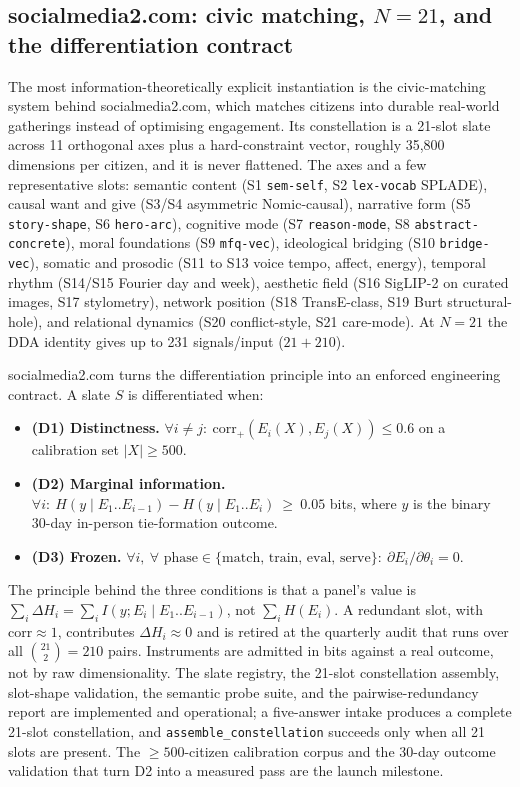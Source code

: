 \documentclass[10pt,twocolumn]{article}
\begin{document}
\subsection{socialmedia2.com: civic matching, $N=21$, and the
differentiation contract}
\label{sec:polis}
The most information-theoretically explicit instantiation is the civic-matching
system behind socialmedia2.com, which matches citizens into
durable real-world gatherings instead of optimising engagement. Its constellation
is a 21-slot slate across 11 orthogonal axes plus a hard-constraint vector,
roughly 35{,}800 dimensions per citizen, and it is never flattened. The axes and a
few representative slots: semantic content (S1 \texttt{sem-self}, S2
\texttt{lex-vocab} SPLADE), causal want and give (S3/S4 asymmetric Nomic-causal),
narrative form (S5 \texttt{story-shape}, S6 \texttt{hero-arc}), cognitive mode (S7
\texttt{reason-mode}, S8 \texttt{abstract-concrete}), moral foundations (S9
\texttt{mfq-vec}), ideological bridging (S10 \texttt{bridge-vec}), somatic and
prosodic (S11 to S13 voice tempo, affect, energy), temporal rhythm (S14/S15
Fourier day and week), aesthetic field (S16 SigLIP-2 on curated images, S17
stylometry), network position (S18 TransE-class, S19 Burt structural-hole), and
relational dynamics (S20 conflict-style, S21 care-mode). At $N=21$ the DDA
identity gives up to 231 signals/input ($21+210$).

socialmedia2.com turns the differentiation principle into an enforced engineering contract. A
slate $S$ is differentiated when:
\begin{itemize}\itemsep0.12em
\item \textbf{(D1) Distinctness.}
$\forall i\neq j:\ \mathrm{corr}_+(E_i(X),E_j(X))\le 0.6$ on a calibration set
$|X|\ge 500$.
\item \textbf{(D2) Marginal information.}
$\forall i:\ H(y\mid E_1..E_{i-1}) - H(y\mid E_1..E_i)\ \ge\ 0.05$ bits, where $y$
is the binary 30-day in-person tie-formation outcome.
\item \textbf{(D3) Frozen.}
$\forall i,\ \forall\text{ phase}\in\{\text{match, train, eval, serve}\}:\
\partial E_i/\partial\theta_i=0$.
\end{itemize}
The principle behind the three conditions is that a panel's value is
$\sum_i\Delta H_i = \sum_i I(y;E_i\mid E_1..E_{i-1})$, not $\sum_i H(E_i)$. A
redundant slot, with $\mathrm{corr}\approx1$, contributes $\Delta H_i\approx 0$
and is retired at the quarterly audit that runs over all $\binom{21}{2}=210$
pairs. Instruments are admitted in bits against a real outcome, not by raw
dimensionality. The slate registry, the 21-slot constellation assembly,
slot-shape validation, the semantic probe suite, and the pairwise-redundancy
report are implemented and operational; a five-answer intake produces a complete
21-slot constellation, and \texttt{assemble\_constellation} succeeds only when all
21 slots are present. The ${\ge}500$-citizen calibration corpus and the 30-day
outcome validation that turn D2 into a measured pass are the launch milestone.
\end{document}
